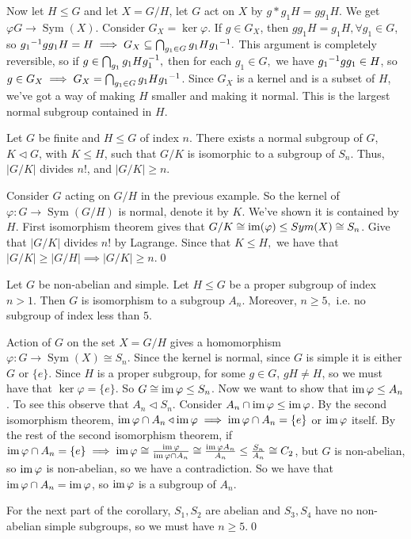 \documentclass{article}
\newcommand{\nrm}{\triangleleft}
\DeclareMathOperator{\sym}{Sym}
\begin{document}
\par
Now let $ H\le G $ and let $ X=G/H $, let $ G $ act on $ X $ by $ g*g_1H=gg_1 H $. We get $ \varphi G\to\sym(X) $. Consider $ G_X=\ker \varphi $. If $ g\in G_X $, then $ gg_1H=g_1H, \forall g_1\in G $, so $ {g_1}^{-1}gg_1 H=H\implies G_X\subseteq \bigcap_{g_1\in G} g_1H{g_1}^{-1}.$ This argument is completely reversible, so if $ g\in\bigcap_{g_1}g_1H{g}^{-1}_1, $ then for each $ g_1\in G, $ we have $ {g_1}^{-1}gg_1\in H $, so $ g\in G_X\implies G_X=\bigcap_{g_1\in G}g_1H{g_1}^{-1} $. Since $ G_X $ is a kernel and is a subset of $ H $, we've got a way of making $ H $ smaller and making it normal. This is the largest normal subgroup contained in $ H $.
\begin{theorem}
	  Let $ G $ be finite and $ H\le G $ of index $ n $. There exists a normal subgroup of $ G $, $ K\nrm G $, with $ K\le H $, such that $ G/K $ is isomorphic to a subgroup of $ S_n $. Thus, $ |G/K| $ divides $ n! $, and $ |G/K|\ge n$.
\end{theorem}
\pf Consider $ G $ acting on $ G/H $ in the previous example. So the kernel of $ \varphi:G\to\sym(G/H) $ is normal, denote it by $ K $. We've shown it is contained by $ H $. First isomorphism theorem gives that $ G/K\cong \operatorname{im}(\varphi)\le Sym(X)\cong S_n $. Give that $ |G/K| $ divides $ n! $ by Lagrange. Since that $ K\le H, $ we have that $ |G/K|\ge |G/H|\implies |G/K|\ge n $.\qed
\begin{corollary}
	  Let $ G $ be non-abelian and simple. Let $ H\le G $ be a proper subgroup of index $ n>1 $. Then $ G $ is isomorphism to a subgroup $ A_n $. Moreover, $ n\ge 5, $ i.e. no subgroup of index less than $ 5 $.
\end{corollary}
\pf Action of $ G $ on the set $ X=G/H $ gives a homomorphism $ \varphi:G\to \sym(X)\cong S_n $. Since the kernel is normal, since $ G $ is simple it is either $ G $ or $ \{e\} $. Since $ H $ is a proper subgroup, for some $ g\in G $, $ gH\ne H $, so we must have that $ \ker \varphi=\{e\} $. So $ G\cong \operatorname{im}\varphi\le S_n $. Now we want to show that $ \operatorname{im}\varphi\le A_n $. To see this observe that $ A_n\nrm S_n $. Consider $ A_n\cap \operatorname{im}\varphi\le \operatorname{im}\varphi $. By the second isomorphism theorem, $ \ima\varphi\cap A_n\nrm \ima\varphi\implies\ima\varphi\cap A_n=\{e\} $ or $ \operatorname{im}\varphi $ itself. By the rest of the second isomorphism theorem, if $ \operatorname{im}\varphi\cap A_n=\{e\}\implies \operatorname{im}\varphi\cong\frac{\operatorname{im}\varphi}{\operatorname{im}\varphi\cap A_n}\cong \frac{\operatorname{im}\varphi A_n}{A_n}\le \frac{S_n}{A_n} \cong C_2 $, but $ G $ is non-abelian, so $ \operatorname{im} \varphi $ is non-abelian, so we have a contradiction. So we have that $ \operatorname{im}\varphi\cap A_n =\operatorname{im}\varphi $, so $ \operatorname{im} \varphi $ is a subgroup of $ A_n $.\par
For the next part of the corollary, $ S_1,S_2 $ are abelian and $ S_3,S_4 $ have no non-abelian simple subgroups, so we must have $ n\ge 5 $.\qed
\end{document}
